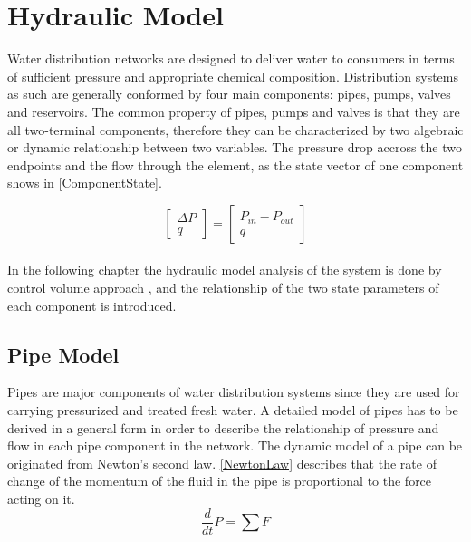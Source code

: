 \section{Hydraulic Model}
\label{HydraulicModel}

Water distribution networks are designed to deliver water  to consumers in terms of sufficient pressure and appropriate chemical composition. Distribution systems as such are generally conformed by four main components: pipes, pumps, valves and reservoirs. The common property of pipes, pumps and valves is that they are all two-terminal components, therefore they can be characterized by two algebraic or dynamic relationship between two variables. The pressure drop accross the two endpoints and the flow through the element, as the state vector of one component shows in \eqref{ComponentState}. \cite{Kallesoe2009} 

\begin{equation}
\label{ComponentState}
 \begin{bmatrix}
    \Delta P \\
    q
\end{bmatrix}
=
 \begin{bmatrix}
    P_{in} - P_{out} \\
    q
\end{bmatrix}
\end{equation}
\\
In the following chapter the hydraulic model analysis of the system is done by control volume approach \cite{Hunt_Fluidmechanics}, 
and the relationship of the two state parameters of each component is introduced.

\subsection{Pipe Model} 
\label{PipeModel}
Pipes are major components of water distribution systems since they are used for carrying pressurized and treated fresh water. A detailed model of pipes has to be derived in a general form in order to describe the relationship of pressure and flow in each pipe component in the network.  
%
The dynamic model of a pipe can be originated from Newton's second law. \eqref{NewtonLaw} describes that the rate of change of the momentum of the fluid in the pipe is proportional to the force acting on it.
\begin{equation}
  \frac{d}{dt} P = \sum F
  \label{NewtonLaw}
\end{equation} 

